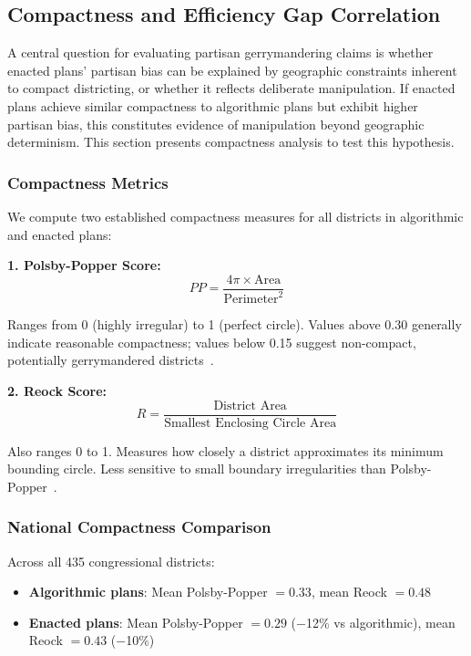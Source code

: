 \subsection{Compactness and Efficiency Gap Correlation}
\label{sec:compactness-correlation}

A central question for evaluating partisan gerrymandering claims is whether enacted plans' partisan bias can be explained by geographic constraints inherent to compact districting, or whether it reflects deliberate manipulation. If enacted plans achieve similar compactness to algorithmic plans but exhibit higher partisan bias, this constitutes evidence of manipulation beyond geographic determinism. This section presents compactness analysis to test this hypothesis.

\subsubsection{Compactness Metrics}

We compute two established compactness measures for all districts in algorithmic and enacted plans:

\textbf{1. Polsby-Popper Score:}
\begin{equation}
PP = \frac{4\pi \times \text{Area}}{\text{Perimeter}^2}
\end{equation}

Ranges from 0 (highly irregular) to 1 (perfect circle). Values above 0.30 generally indicate reasonable compactness; values below 0.15 suggest non-compact, potentially gerrymandered districts~\cite{polsby1991third}.

\textbf{2. Reock Score:}
\begin{equation}
R = \frac{\text{District Area}}{\text{Smallest Enclosing Circle Area}}
\end{equation}

Also ranges 0 to 1. Measures how closely a district approximates its minimum bounding circle. Less sensitive to small boundary irregularities than Polsby-Popper~\cite{reock1961measure}.

\subsubsection{National Compactness Comparison}

Across all 435 congressional districts:

\begin{itemize}
    \item \textbf{Algorithmic plans}: Mean Polsby-Popper $= 0.33$, mean Reock $= 0.48$
    \item \textbf{Enacted plans}: Mean Polsby-Popper $= 0.29$ ($-$12\% vs algorithmic), mean Reock $= 0.43$ ($-$10\%)
\end{itemize}

